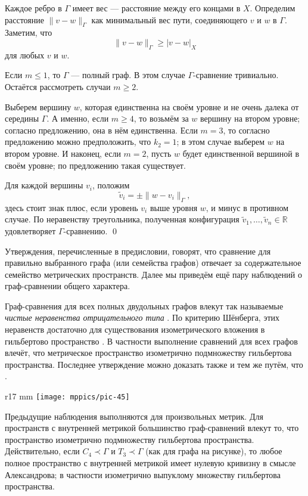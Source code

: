 \documentclass{article}
\def\parbf#1{\medskip\noindent{\bf #1}}
\def\qeds{\qed\par\medskip}
\begin{document}
Каждое ребро в $\Gamma$ имеет вес --- расстояние между его концами в $X$.
Определим расстояние $\|v-w\|_\Gamma$ как минимальный вес пути, соединяющего $v$ и $w$ в $\Gamma$.
Заметим, что 
\[\|v-w\|_\Gamma\geqslant |v-w|_X\]
для любых $v$ и $w$.

Если $m\leqslant 1$, то $\Gamma$ --- полный граф.
В этом случае $\Gamma$-сравнение тривиально.
Остаётся рассмотреть случаи $m\geqslant2$.

Выберем вершину $w$, которая единственна на своём уровне и не очень далека от середины $\Gamma$.
А именно, если $m\geqslant 4$, то возьмём за $w$ вершину на втором уровне; 
согласно предложению, она в нём единственна.
Если $m=3$, то согласно предложению можно предположить, что $k_2=1$;
в этом случае выберем $w$ на втором уровне.
И наконец, если $m=2$, пусть $w$ будет единственной вершиной в своём уровне;
по предложению такая существует.

Для каждой вершины $v_i$, положим
\[\tilde v_i=\pm \|w-v_i\|_\Gamma,\]
здесь стоит знак плюс, если уровень $v_i$ выше уровня $w$, и минус в противном случае.
По неравенству треугольника, полученная конфигурация $\tilde v_1,\dots,\tilde v_n\in\mathbb{R}$ удовлетворяет $\Gamma$-сравнению.
\qeds

\parbf{Замечания.}
Утверждения, перечисленные в предисловии, говорят, что сравнение для правильно выбранного графа (или семейства графов) отвечает за содержательное семейство метрических пространств.
Далее мы приведём ещё пару наблюдений о граф-сравнении общего характера.

Граф-сравнения для всех полных двудольных графов влекут так называемые \emph{чистые неравенства отрицательного типа} \cite[6.1.1]{deza-laurent-ru}.
По критерию Шёнберга, этих неравенств достаточно для существования изометрического вложения в гильбертово пространство \cite[6.2.1]{deza-laurent-ru}.
В частности выполнение сравнений для всех графов влечёт, что метрическое пространство изометрично подмножеству гильбертова пространства.
Последнее утверждение можно доказать также и тем же путём, что \cite[Prop. 1.9]{toyoda}.


\begin{wrapfigure}{r}{17 mm}
\vskip-6mm
\centering
\texttt{[image: mppics/pic-45]}
\vskip-2mm
\end{wrapfigure}

Предыдущие наблюдения выполняются для произвольных метрик.
Для пространств с внутренней метрикой большинство граф-сравнений влекут то, что пространство изометрично подмножеству гильбертова пространства.
Действительно, если $C_4\prec\Gamma$ и $T_3\prec\Gamma$ (как для графа на рисунке),
то любое полное пространство с внутренней метрикой имеет нулевую кривизну в смысле Александрова; 
в частности изометрично выпуклому множеству гильбертова пространства.
\end{document}
